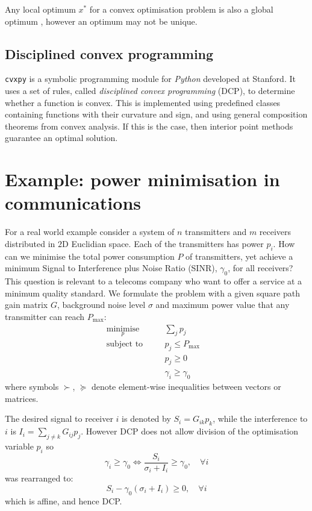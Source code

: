 \documentclass[twocolumn,secnumarabic,amssymb, nobibnotes, aps, prl,superscriptaddress]{revtex4-1}
\begin{document}
Any local optimum $x^*$ for a convex optimisation problem is also a global optimum \cite[pp.138-139]{cvxpybook}, however an optimum may not be unique.

\subsection{Disciplined convex programming}
\texttt{cvxpy} is a symbolic programming module for \textit{Python} developed at Stanford\cite{cvxpy}. It uses a set of rules, called \textit{disciplined convex programming} (DCP), to determine whether a function is convex. This is implemented using predefined classes containing functions with their curvature and sign, and using general composition theorems from convex analysis. If this is the case, then interior point methods guarantee an optimal solution.

\section{Example: power minimisation in communications}
For a real world example consider a system of $n$ transmitters and $m$ receivers distributed in $2$D Euclidian space. Each of the transmitters has power $p_i$. How can we minimise the total power consumption $P$ of transmitters, yet achieve a minimum Signal to Interference plus Noise Ratio (SINR), $\gamma_0$, for all receivers? This question is relevant to a telecoms company who want to offer a service at a minimum quality standard. We formulate the problem with a given square path gain matrix $G$, background noise level $\sigma$ and maximum power value that any transmitter can reach $P_{\text{max}}$:
\begin{align*}
&\underset{p}{\text{minimise}} \quad &&\sum_j p_j\\
&\text{subject to} \quad &&p_j \leq P_{\max}\\
& \quad &&p_j \geq 0\\
& \quad &&\gamma_i \geq \gamma_0&&
\end{align*}
where symbols $\succ$, $\succeq$ denote element-wise inequalities between vectors or matrices.

The desired signal to receiver $i$ is denoted by $S_i = G_{ik}p_k$, while the interference to $i$ is $I_i = \sum_{j\neq k}G_{ij}p_j$. However DCP does not allow division of the optimisation variable $p_i$ so  
\begin{equation*}
  \gamma_i \geq \gamma_0\Longleftrightarrow  \frac{S_i}{\sigma_i + I_i}\geq \gamma_0, \quad \forall i
\end{equation*}
was rearranged to:
\begin{equation*}
S_i-\gamma_0(\sigma_i + I_i)\geq 0, \quad \forall i
\end{equation*} which is affine, and hence DCP.
\end{document}

